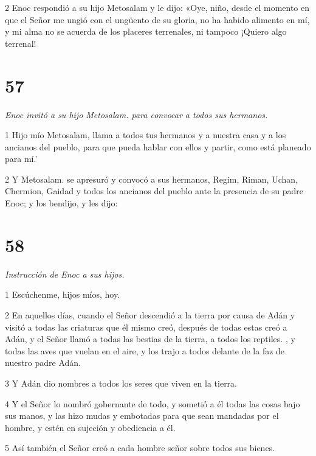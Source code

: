 \par 2 Enoc respondió a su hijo Metosalam y le dijo: «Oye, niño, desde el momento en que el Señor me ungió con el ungüento de su gloria, no ha habido alimento en mí, y mi alma no se acuerda de los placeres terrenales, ni tampoco ¡Quiero algo terrenal!

\chapter{57}

\par \textit{Enoc invitó a su hijo Metosalam. para convocar a todos sus hermanos.}

\par 1 Hijo mío Metosalam, llama a todos tus hermanos y a nuestra casa y a los ancianos del pueblo, para que pueda hablar con ellos y partir, como está planeado para mí.'

\par 2 Y Metosalam. se apresuró y convocó a sus hermanos, Regim, Riman, Uchan, Chermion, Gaidad y todos los ancianos del pueblo ante la presencia de su padre Enoc; y los bendijo, y les dijo:

\chapter{58}

\par \textit{Instrucción de Enoc a sus hijos.}

\par 1 Escúchenme, hijos míos, hoy.

\par 2 En aquellos días, cuando el Señor descendió a la tierra por causa de Adán y visitó a todas las criaturas que él mismo creó, después de todas estas creó a Adán, y el Señor llamó a todas las bestias de la tierra, a todos los reptiles. , y todas las aves que vuelan en el aire, y los trajo a todos delante de la faz de nuestro padre Adán.

\par 3 Y Adán dio nombres a todos los seres que viven en la tierra.

\par 4 Y el Señor lo nombró gobernante de todo, y sometió a él todas las cosas bajo sus manos, y las hizo mudas y embotadas para que sean mandadas por el hombre, y estén en sujeción y obediencia a él.

\par 5 Así también el Señor creó a cada hombre señor sobre todos sus bienes.

